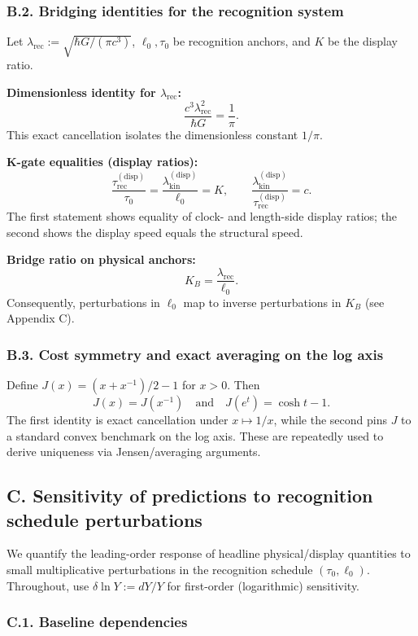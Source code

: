 \documentclass[12pt,a4paper]{article}
\theoremstyle{definition}
\theoremstyle{remark}
\begin{document}
\subsubsection*{B.2. Bridging identities for the recognition system}

Let \(\lambda_{\text{rec}} := \sqrt{\hbar G/(\pi c^3)}\), \(\ell_0, \tau_0\) be recognition anchors, and \(K\) be the display ratio.

\textbf{Dimensionless identity for \(\lambda_{\text{rec}}\):}
$$\frac{c^3 \lambda_{\text{rec}}^2}{\hbar G} = \frac{1}{\pi}.$$
This exact cancellation isolates the dimensionless constant \(1/\pi\).

\textbf{K-gate equalities (display ratios):}
$$\frac{\tau_{\text{rec}}^{(\text{disp})}}{\tau_0} = \frac{\lambda_{\text{kin}}^{(\text{disp})}}{\ell_0} = K, \qquad \frac{\lambda_{\text{kin}}^{(\text{disp})}}{\tau_{\text{rec}}^{(\text{disp})}} = c.$$
The first statement shows equality of clock- and length-side display ratios; the second shows the display speed equals the structural speed.

\textbf{Bridge ratio on physical anchors:}
$$K_B = \frac{\lambda_{\text{rec}}}{\ell_0}.$$
Consequently, perturbations in \(\ell_0\) map to inverse perturbations in \(K_B\) (see Appendix C).

\subsubsection*{B.3. Cost symmetry and exact averaging on the log axis}

Define \(J(x) = (x + x^{-1})/2 - 1\) for \(x > 0\). Then
$$J(x) = J(x^{-1}) \quad \text{and} \quad J(e^t) = \cosh t - 1.$$
The first identity is exact cancellation under \(x \mapsto 1/x\), while the second pins \(J\) to a standard convex benchmark on the log axis. These are repeatedly used to derive uniqueness via Jensen/averaging arguments.

\subsection*{C. Sensitivity of predictions to recognition schedule perturbations}

We quantify the leading-order response of headline physical/display quantities to small multiplicative perturbations in the recognition schedule \((\tau_0, \ell_0)\). Throughout, use \(\delta\ln Y := dY/Y\) for first-order (logarithmic) sensitivity.

\subsubsection*{C.1. Baseline dependencies}
\end{document}
